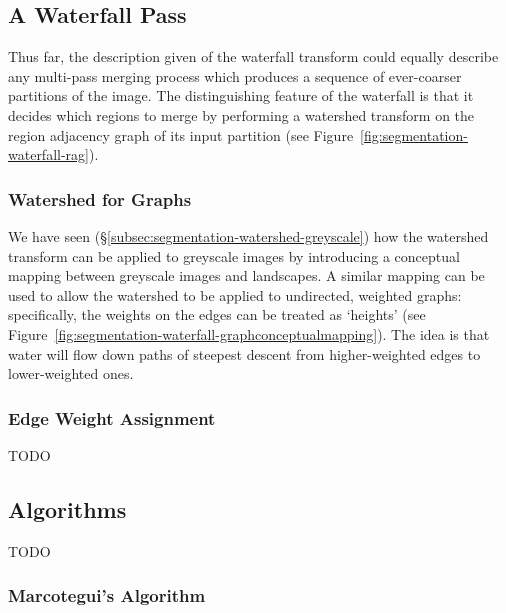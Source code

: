 
\subsection{A Waterfall Pass}

Thus far, the description given of the waterfall transform could equally describe any multi-pass merging process which produces a sequence of ever-coarser partitions of the image. The distinguishing feature of the waterfall is that it decides which regions to merge by performing a watershed transform on the region adjacency graph of its input partition (see Figure~\ref{fig:segmentation-waterfall-rag}).


\subsubsection{Watershed for Graphs}

We have seen (\S\ref{subsec:segmentation-watershed-greyscale}) how the watershed transform can be applied to greyscale images by introducing a conceptual mapping between greyscale images and landscapes. A similar mapping can be used to allow the watershed to be applied to undirected, weighted graphs: specifically, the weights on the edges can be treated as `heights' (see Figure~\ref{fig:segmentation-waterfall-graphconceptualmapping}). The idea is that water will flow down paths of steepest descent from higher-weighted edges to lower-weighted ones.



\subsubsection{Edge Weight Assignment}

TODO

\subsection{Algorithms}

TODO

\subsubsection{Marcotegui's Algorithm}

